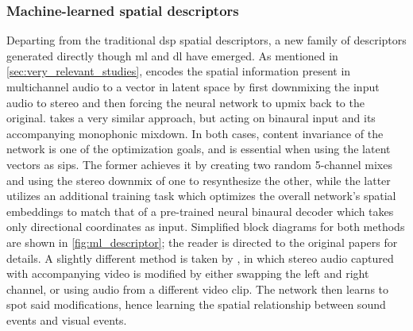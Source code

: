 \documentclass[referee,pdflatex,sn-mathphys-num]{sn-jnl}%
\begin{document}
\subsubsection{Machine-learned spatial descriptors}
\label{sec:ml_spatial_descriptors}

Departing from the traditional \gls{dsp} spatial descriptors, a new family of descriptors generated directly though \gls{ml} and \gls{dl} have emerged. As mentioned in \cref{sec:very_relevant_studies}, \cite{yangUpmixingStyleTransfer2022} encodes the spatial information present in multichannel audio to a vector in latent space by first downmixing the input audio to stereo and then forcing the neural network to upmix back to the original. \cite{manochaSpatializationQualityMetric2023} takes a very similar approach, but acting on binaural input and its accompanying monophonic mixdown. In both cases, content invariance of the network is one of the optimization goals, and is essential when using the latent vectors as \glspl{sip}. The former achieves it by creating two random 5-channel mixes and using the stereo downmix of one to resynthesize the other, while the latter utilizes an additional training task which optimizes the overall network's spatial embeddings to match that of a pre-trained neural binaural decoder which takes only directional coordinates as input. Simplified block diagrams for both methods are shown in \cref{fig:ml_descriptor}; the reader is directed to the original papers for details. A slightly different method is taken by \cite{satoSelfSupervisedLearningAudioVisual2022}, in which stereo audio captured with accompanying video is modified by either swapping the left and right channel, or using audio from a different video clip. The network then learns to spot said modifications, hence learning the spatial relationship between sound events and visual events.
\end{document}
